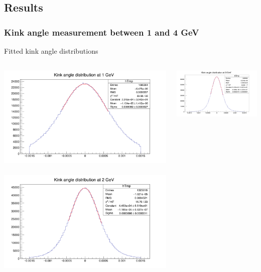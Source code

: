 \documentclass{beamer}
\begin{document}
    \subsection{Results}

    \begin{frame}
      \frametitle{Kink angle measurement between 1 and 4 GeV}

      \begin{block}{Fitted kink angle distributions}
        \begin{columns}[c]
          \begin{column}{5cm}
            \centering
            \includegraphics[width = \textwidth]{Pictures/kinkAngle1GeV.png}
            \
            \includegraphics[width = \textwidth]{Pictures/kinkAngle2GeV.png} 
          \end{column} 
          \begin{column}{5cm}
            \centering
            \includegraphics[width = \textwidth]{Pictures/kinkAngle3GeV.png}

\end{column}
\end{columns}
\end{block}
\end{frame}
\end{document}
